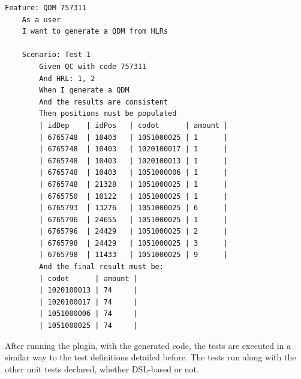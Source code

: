 \begin{lstlisting}[frame=single, language=Cucumber, caption={\it Cucumber feature}, label={code:cucumber}]
Feature: QDM 757311
	As a user
	I want to generate a QDM from HLRs

	Scenario: Test 1
		Given QC with code 757311
		And HRL: 1, 2
		When I generate a QDM
		And the results are consistent
		Then positions must be populated
		| idDep    | idPos   | codot      | amount |
		| 6765748  | 10403   | 1051000025 | 1      |
		| 6765748  | 10403   | 1020100017 | 1      |
		| 6765748  | 10403   | 1020100013 | 1      |
		| 6765748  | 10403   | 1051000006 | 1      |
		| 6765748  | 21328   | 1051000025 | 1      |
		| 6765750  | 10122   | 1051000025 | 1      |    
		| 6765793  | 13276   | 1051000025 | 6      |
		| 6765796  | 24655   | 1051000025 | 1      |
		| 6765796  | 24429   | 1051000025 | 2      |
		| 6765798  | 24429   | 1051000025 | 3      |
		| 6765798  | 11433   | 1051000025 | 9      |   
		And the final result must be:
		| codot      | amount |
		| 1020100013 | 74     |
		| 1020100017 | 74     |
		| 1051000006 | 74     |
		| 1051000025 | 74     |

\end{lstlisting}



After running the plugin, with the generated code, the tests are executed in a similar way to the test 
definitions detailed before. The tests run along with the other unit tests declared, 
whether DSL-based or not.
